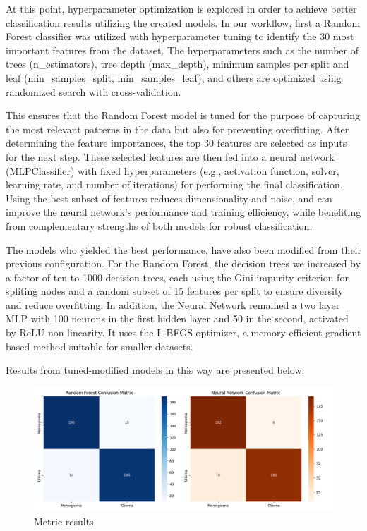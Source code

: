 \documentclass[11pt,a4paper]{article}
\begin{document}
		At this point, hyperparameter optimization is explored in order to achieve better classification
		results utilizing the created models.
		In our workflow,  first a Random Forest classifier was utilized with hyperparameter tuning 
		to identify the 30 most important features from the dataset. 
		The hyperparameters such as the number of trees (n\_estimators), tree depth (max\_depth), 
		minimum samples per split and leaf (min\_samples\_split, min\_samples\_leaf), 
		and others are optimized using randomized search with cross-validation. 
		
		This ensures that the Random Forest model is tuned for the purpose of capturing
		the most relevant patterns in the data but also for preventing overfitting. 
		After determining the feature importances, the top 30 features are selected as inputs for the next step.
		These selected features are then fed into a neural network (MLPClassifier) 
		with fixed hyperparameters (e.g., activation function, solver, learning rate, and number of iterations) for
		performing the final classification. 
		Using the best subset of features reduces dimensionality and noise, and can improve the 
		neural network’s performance and training efficiency, 
		while benefiting from complementary strengths of both models for robust classification.
	

		The models who yielded the best performance, 
		have also been modified from their previous configuration.
		For the Random Forest, the decision trees we increased by a factor of ten to 1000 decision trees, 
		each using the Gini impurity criterion for spliting  nodes and a random subset of 15 features per split
		to ensure diversity and reduce overfitting. 
		In addition, the Neural Network remained a two layer MLP with 100 neurons in the first hidden layer and 
		50 in the second, activated by ReLU non-linearity. 
		It uses the L-BFGS optimizer, a memory-efficient gradient based method 
		suitable for smaller datasets. 


		Results from tuned-modified models in this way are presented below.


		\begin{figure}[H]
			\centering
			\includegraphics[width=1.1\textwidth]{images/metrics_hyper.png}
			\caption{Metric results.}
			\label{fig1:}
		\end{figure}		
\end{document}
